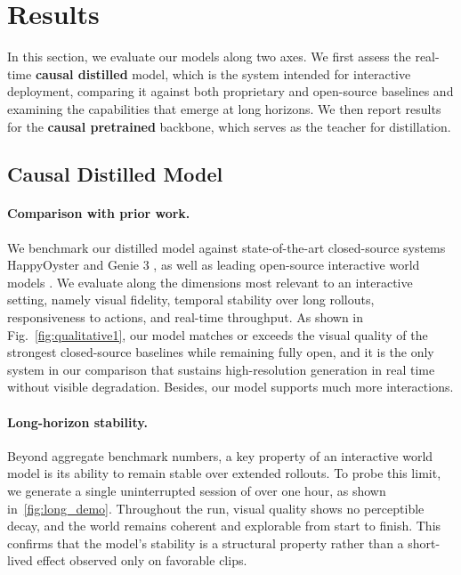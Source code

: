 \section{Results}\label{sec:results}

In this section, we evaluate our models along two axes. We first assess the real-time \textbf{causal distilled} model, which is the system intended for interactive deployment, comparing it against both proprietary and open-source baselines and examining the capabilities that emerge at long horizons. We then
report results for the \textbf{causal pretrained} backbone, which serves as the teacher for distillation.

\subsection{Causal Distilled Model}
\label{subsec:distill}

\paragraph{Comparison with prior work.}
We benchmark our distilled model against state-of-the-art closed-source systems HappyOyster \cite{happyoyster} and Genie 3 \cite{genie3}, as well as leading open-source interactive
world models \cite{zhu2026sana,matrix3,team2026dreamx,lingbot-world,Worldplay}. We evaluate along the dimensions most relevant to an interactive setting, namely visual fidelity, temporal stability over long rollouts, responsiveness to actions, and real-time throughput. As shown in Fig.~\ref{fig:qualitative1}, our model matches or exceeds the visual quality of the strongest closed-source baselines while remaining fully open, and it is the
only system in our comparison that sustains high-resolution generation in real time without visible degradation. Besides, our model supports much more interactions. 

\paragraph{Long-horizon stability.}
Beyond aggregate benchmark numbers, a key property of an interactive world model is its ability to remain stable over extended rollouts. To probe this limit, we generate a single uninterrupted session of over one hour, as shown in~\cref{fig:long_demo}. Throughout the run, visual quality shows no perceptible decay, and the world remains coherent and explorable from start to finish. This confirms that the model's stability is a structural property rather than a short-lived effect observed only on favorable clips.

